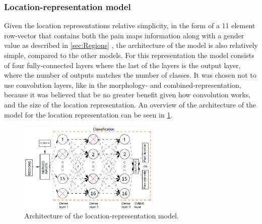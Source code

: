 \subsubsection{Location-representation model}
Given the location representations relative simplicity, in the form of a 11 element row-vector that contains both the pain maps information along with a gender value as described in \ref{sec:Regions} , the architecture of the model is also relatively simple, compared to the other models.  
For this representation the model consists of four fully-connected layers where the last of the layers is the output layer, where the number of outputs matches the number of classes. 
It was chosen not to use convolution layers, like in the morphology- and combined-representation, because it was believed that be no greater benefit given how convolution works, and the size of the location representation. 
An overview of the architecture of the model for the location representation can be seen in \ref{fig:Simpleschema}.

\begin{figure} [H]
\centering
\includegraphics[width=0.6\textwidth]{figures/Simpleschema}
\caption{Architecture of the location-representation model.}
\label{fig:Simpleschema} 
\end{figure}


